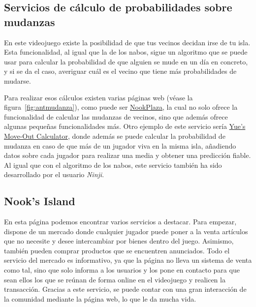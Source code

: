 \subsection{Servicios de cálculo de probabilidades sobre mudanzas}

En este videojuego existe la posibilidad de que tus vecinos decidan irse de tu isla. Esta funcionalidad, al igual que la de los nabos, sigue un algoritmo que se puede usar para calcular la probabilidad de que alguien se mude en un día en concreto, y si se da el caso, averiguar cuál es el vecino que tiene más probabilidades de mudarse.\\


Para realizar esos cálculos existen varias páginas web {(v\'ease la figura~\ref{fig:antmudanza})}, como puede ser \href{https://nookplaza.net/tools?tab=move_out}{NookPlaza}, la cual no solo ofrece la funcionalidad de calcular las mudanzas de vecinos, sino que además ofrece algunas pequeñas funcionalidades más. Otro ejemplo de este servicio sería \href{https://yuexr.github.io/villager-moveout-calculator/}{Yue's Move-Out Calculator}, donde además se puede calcular la probabilidad de mudanza en caso de que más de un jugador viva en la misma isla, añadiendo datos sobre cada jugador para realizar una media y obtener una predicción fiable.\\

Al igual que con el algoritmo de los nabos, este servicio también ha sido desarrollado por el usuario \textit{Ninji}.

\subsection{Nook’s Island}


En esta página podemos encontrar varios servicios a destacar. Para empezar, dispone de un mercado donde cualquier jugador puede poner a la venta artículos que no necesite y desee intercambiar por bienes dentro del juego. Asimismo, también pueden comprar productos que se encuentren anunciados. Todo el servicio del mercado es informativo, ya que la página no lleva un sistema de venta como tal, sino que solo informa a los usuarios y los pone en contacto para que sean ellos los que se reúnan de forma online en el videojuego y realicen la transacción. Gracias a este servicio, se puede contar con una gran interacción de la comunidad mediante la página web, lo que le da mucha vida.\\

